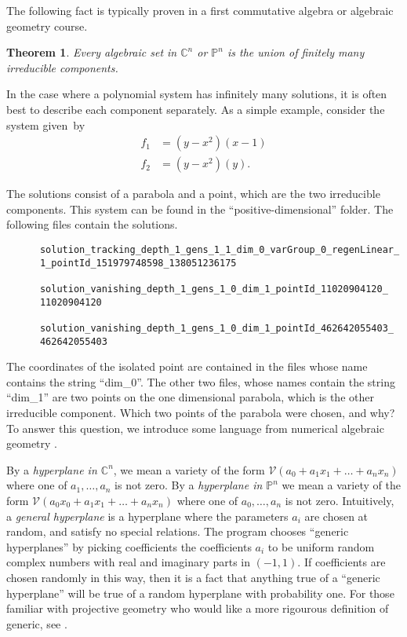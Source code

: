 \documentclass[12pt]{article}
\newtheorem{theorem}{Theorem}[section]
\theoremstyle{definition}
\newcommand{\C}{\mathbb{C}}
\newcommand{\PP}{\mathbb{P}}
\begin{document}
The following fact is typically proven in a first commutative algebra or 
algebraic geometry course.
\begin{theorem}
   Every algebraic set in $\C^n$ or $\PP^n$ is the union of finitely 
   many irreducible components.
\end{theorem}

In the case where a polynomial system has infinitely many solutions, it is 
often best to describe each component separately. As a simple example, 
consider the system given~by 
\begin{align*}
   f_1 &= (y-x^2)(x-1) \\
   f_2 &= (y-x^2)(y).
\end{align*}

The solutions consist of a parabola and a point, which are the two 
irreducible components. This system can be found in the 
``positive-dimensional'' folder. The following files contain the solutions.
\begin{leftbar}
\vspace{-10pt} 
\begin{verbatim}
      solution_tracking_depth_1_gens_1_1_dim_0_varGroup_0_regenLinear_
      1_pointId_151979748598_138051236175

      solution_vanishing_depth_1_gens_1_0_dim_1_pointId_11020904120_
      11020904120

      solution_vanishing_depth_1_gens_1_0_dim_1_pointId_462642055403_
      462642055403
\end{verbatim}\vspace{-10pt} 
\end{leftbar}

The coordinates of the isolated point are contained in the files whose 
name contains the string ``dim\_0''. The other two files, whose names 
contain the string ``dim\_1'' are two points on the one dimensional 
parabola, which is the other irreducible component. Which two points of 
the parabola were chosen, and why? To answer this question, we introduce 
some language from numerical algebraic geometry \cite{BertiniBook,SWBook}.

By a \emph{hyperplane in $\C^n$}, we mean a variety of the form 
$\mathcal{V}(a_0 + a_1x_1 + \ldots + a_nx_n)$ where one of $a_1, \ldots, 
a_n$ is not zero. By a \emph{hyperplane in 
$\PP^n$} we mean a variety of the form $\mathcal{V}(a_0x_0 + a_1x_1 
+ \ldots + a_nx_n)$ where one of $a_0, \ldots, a_n$ is not zero. 
Intuitively, a \emph{general hyperplane} is a 
hyperplane where the parameters $a_i$ are chosen at random, and satisfy 
no special relations. The program chooses ``generic hyperplanes'' by 
picking coefficients the coefficients $a_i$ to be uniform random 
complex numbers with real and imaginary parts in $(-1, 1)$. If 
coefficients are chosen randomly in this way, then it is a fact that 
anything true of a ``generic hyperplane'' will be true of a random 
hyperplane with probability one. For those 
familiar with projective geometry who would like a more rigourous 
definition of generic, see \cite{SWBook}.
\end{document}

